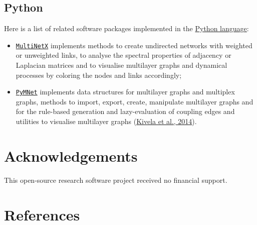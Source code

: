 \documentclass[
]{article}
\providecommand{\tightlist}{%
  \setlength{\itemsep}{0pt}\setlength{\parskip}{0pt}}
\begin{document}
\hypertarget{python}{%
\subsection{Python}\label{python}}

Here is a list of related software packages implemented in the
\href{https://www.python.org}{Python language}:

\begin{itemize}
\tightlist
\item
  \href{https://github.com/nkoub/multinetx}{\texttt{MultiNetX}}
  implements methods to create undirected networks with weighted or
  unweighted links, to analyse the spectral properties of adjacency or
  Laplacian matrices and to visualise multilayer graphs and dynamical
  processes by coloring the nodes and links accordingly;
\item
  \href{https://github.com/bolozna/Multilayer-networks-library}{\texttt{PyMNet}}
  implements data structures for multilayer graphs and multiplex graphs,
  methods to import, export, create, manipulate multilayer graphs and
  for the rule-based generation and lazy-evaluation of coupling edges
  and utilities to visualise multilayer graphs
  (\protect\hyperlink{ref-Kivela2014}{Kivela et al., 2014}).
\end{itemize}

\hypertarget{acknowledgements}{%
\section{Acknowledgements}\label{acknowledgements}}

This open-source research software project received no financial
support.

\hypertarget{references}{%
\section*{References}\label{references}}
\end{document}
